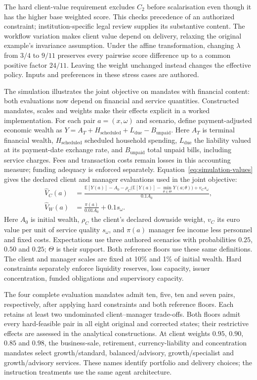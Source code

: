 \documentclass[oneside,10pt,english]{swissi}
\begin{document}
The hard client-value requirement excludes $C_2$ before scalarisation even though it has the higher base weighted score. This checks precedence of an authorized constraint; institution-specific legal review supplies its substantive content. The workflow variation makes client value depend on delivery, relaxing the original example's invariance assumption. Under the affine transformation, changing $\lambda$ from $3/4$ to $9/11$ preserves every pairwise score difference up to a common positive factor $24/11$. Leaving the weight unchanged instead changes the effective policy. Inputs and preferences in these stress cases are authored.

The simulation illustrates the joint objective on mandates with financial content: both evaluations now depend on financial and service quantities. Constructed mandates, scales and weights make their effects explicit in a worked implementation. For each pair $a=(x,\omega)$ and scenario, define payment-adjusted economic wealth as $Y=A_T+H_{\mathrm{scheduled}}+L_{\mathrm{due}}-B_{\mathrm{unpaid}}$. Here $A_T$ is terminal financial wealth, $H_{\mathrm{scheduled}}$ scheduled household spending, $L_{\mathrm{due}}$ the liability valued at its payment-date exchange rate, and $B_{\mathrm{unpaid}}$ total unpaid bills, including service charges. Fees and transaction costs remain losses in this accounting measure; funding adequacy is enforced separately. Equation~\eqref{eq:simulation-values} gives the declared client and manager evaluations used in the joint objective:
\begin{align}
 \widehat V_C(a)&=\frac{\mathbb E[Y(a)]-A_0-\rho_C\bigl(\mathbb E[Y(a)]-\min_{\theta\in\Theta}Y(a;\theta)\bigr)+v_Cs_\omega}{0.1A_0},\nonumber\\
 \widehat V_W(a)&=\frac{\pi(a)}{0.01A_0}+0.1s_\omega.
 \label{eq:simulation-values}
\end{align}
Here $A_0$ is initial wealth, $\rho_C$ the client's declared downside weight, $v_C$ its euro value per unit of service quality $s_\omega$, and $\pi(a)$ manager fee income less personnel and fixed costs. Expectations use three authored scenarios with probabilities $0.25$, $0.50$ and $0.25$; $\Theta$ is their support. Both reference floors use these same definitions. The client and manager scales are fixed at 10\% and 1\% of initial wealth. Hard constraints separately enforce liquidity reserves, loss capacity, issuer concentration, funded obligations and supervisory capacity.

The four complete evaluation mandates admit ten, five, ten and seven pairs, respectively, after applying hard constraints and both reference floors. Each retains at least two undominated client--manager trade-offs. Both floors admit every hard-feasible pair in all eight original and corrected states; their restrictive effects are assessed in the analytical constructions. At client weights $0.95$, $0.90$, $0.85$ and $0.98$, the business-sale, retirement, currency-liability and concentration mandates select growth/standard, balanced/advisory, growth/specialist and growth/advisory services. These names identify portfolio and delivery choices; the instruction treatments use the same agent architecture.
\end{document}
